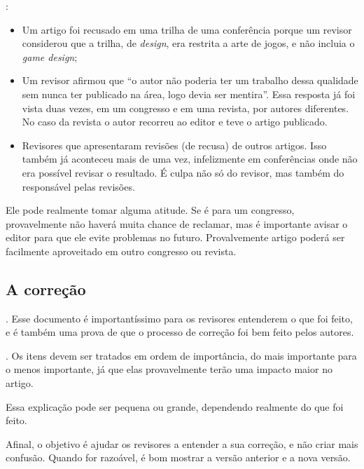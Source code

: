 \documentclass[openany]{book}
\begin{document}
:
\begin{itemize}
    \item Um artigo foi recusado em uma trilha de uma conferência porque um revisor considerou que a trilha, de \textit{design}, era restrita a arte de jogos, e não incluia o \textit{game design};
    \item Um revisor afirmou que ``o autor não poderia ter um trabalho dessa qualidade sem nunca ter publicado na área, logo devia ser mentira''.  Essa resposta já foi vista duas vezes, em um congresso e em uma revista, por autores diferentes. No caso da revista o autor recorreu ao editor e teve o artigo publicado.
    \item Revisores que apresentaram revisões (de recusa) de outros artigos. Isso também já aconteceu mais de uma vez, infelizmente em conferências onde não era possível revisar o resultado. É culpa não só do revisor, mas também do responsável pelas revisões.
\end{itemize}

 Ele pode realmente tomar alguma atitude. Se é para um congresso, provavelmente não haverá muita chance de reclamar, mas é importante avisar o editor para que ele evite problemas no futuro. Provalvemente artigo poderá ser facilmente aproveitado em outro congresso ou revista.

\subsection{A correção}

. Esse documento é importantíssimo para os revisores entenderem o que foi feito, e é também uma prova de que o processo de correção foi bem feito pelos autores.

. Os itens devem ser tratados em ordem de importância, do mais importante para o menos importante, já que elas provavelmente terão uma impacto maior no artigo.

 Essa explicação pode ser pequena ou grande, dependendo realmente do que foi feito.

 Afinal, o objetivo é ajudar os revisores a entender a sua correção, e não criar mais confusão.  Quando for razoável, é bom mostrar a versão anterior e a nova versão.
\end{document}
